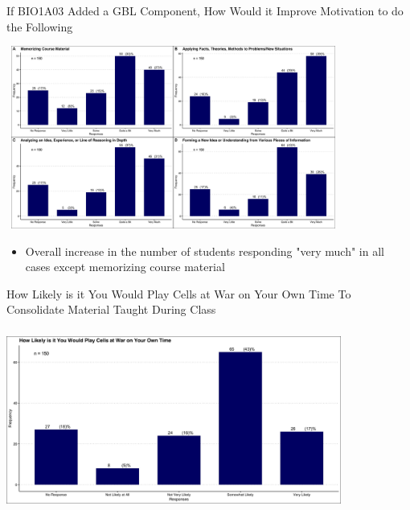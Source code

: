 \documentclass{beamer}
\begin{document}
	\begin{frame}{If BIO1A03 Added a GBL Component, How Would it Improve Motivation to do the Following}
		\begin{center}
			\includegraphics[width=11cm, height=6cm]{ifbio1a03_added_gblcomponent.jpg}
			\begin{itemize}
				\item Overall increase in the number of students responding "very much" in all cases except memorizing course material
			\end{itemize}
		\end{center}
	\end{frame}

	\begin{frame}{How Likely is it You Would Play Cells at War on Your Own Time To Consolidate Material Taught During Class}
		\begin{center}
			\includegraphics[width=11cm, height=6cm]{how_likely_you_would_play_cellsatwar.jpg}
		\end{center}
	\end{frame}
\end{document}
